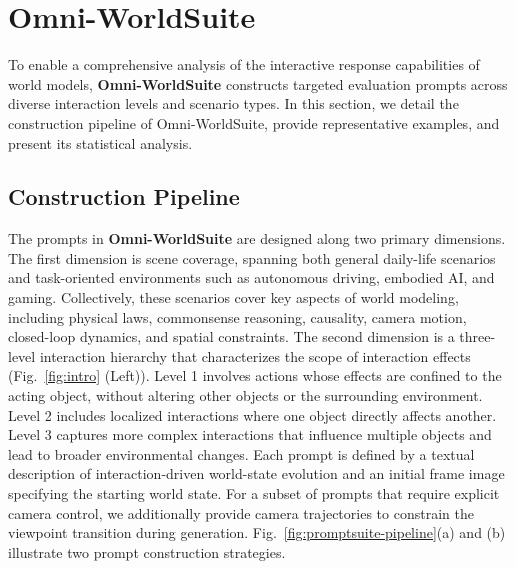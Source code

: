 


\section{Omni-WorldSuite}
\label{sec:interworld_suite}

To enable a comprehensive analysis of the interactive response capabilities of world models, \textbf{Omni-WorldSuite} constructs targeted evaluation prompts across diverse interaction levels and scenario types. In this section, we detail the construction pipeline of Omni-WorldSuite, provide representative examples, and present its statistical analysis.

\subsection{Construction Pipeline}



The prompts in \textbf{Omni-WorldSuite} are designed along two primary dimensions. The first dimension is scene coverage, spanning both general daily-life scenarios and task-oriented environments such as autonomous driving, embodied AI, and gaming. Collectively, these scenarios cover key aspects of world modeling, including physical laws, commonsense reasoning, causality, camera motion, closed-loop dynamics, and spatial constraints. The second dimension is a three-level interaction hierarchy that characterizes the scope of interaction effects (Fig.~\ref{fig:intro} (Left)). Level 1 involves actions whose effects are confined to the acting object, without altering other objects or the surrounding environment. Level 2 includes localized interactions where one object directly affects another. Level 3 captures more complex interactions that influence multiple objects and lead to broader environmental changes. Each prompt is defined by a textual description of interaction-driven world-state evolution and an initial frame image specifying the starting world state. For a subset of prompts that require explicit camera control, we additionally provide camera trajectories to constrain the viewpoint transition during generation. 
Fig.~\ref{fig:promptsuite-pipeline}(a) and (b) illustrate two prompt construction strategies.


